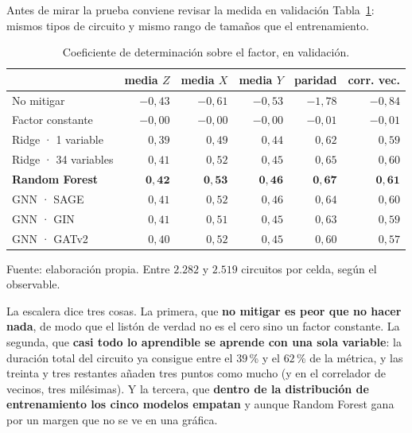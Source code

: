 Antes de mirar la prueba conviene revisar la medida en validación
Tabla~\ref{tab:escalera_val}: mismos tipos de circuito y mismo rango de tamaños que el entrenamiento.

\begin{table}[htbp]
    \centering
    \caption{Coeficiente de determinación sobre el factor, en validación.}
    \label{tab:escalera_val}
    {\footnotesize
    \begin{tabular}{@{}lrrrrr@{}}
        \toprule
        & \textbf{media $Z$} & \textbf{media $X$} & \textbf{media $Y$}
        & \textbf{paridad} & \textbf{corr. vec.} \\
        \midrule
        No mitigar            & $-0{,}43$ & $-0{,}61$ & $-0{,}53$ & $-1{,}78$ & $-0{,}84$ \\
        Factor constante      & $-0{,}00$ & $-0{,}00$ & $-0{,}00$ & $-0{,}01$ & $-0{,}01$ \\
        Ridge · 1 variable    & $0{,}39$ & $0{,}49$ & $0{,}44$ & $0{,}62$ & $0{,}59$ \\
        Ridge · 34 variables  & $0{,}41$ & $0{,}52$ & $0{,}45$ & $0{,}65$ & $0{,}60$ \\
        \textbf{Random Forest} & $\bm{0{,}42}$ & $\bm{0{,}53}$ & $\bm{0{,}46}$ & $\bm{0{,}67}$ & $\bm{0{,}61}$ \\
        GNN · SAGE            & $0{,}41$ & $0{,}52$ & $0{,}46$ & $0{,}64$ & $0{,}60$ \\
        GNN · GIN             & $0{,}41$ & $0{,}51$ & $0{,}45$ & $0{,}63$ & $0{,}59$ \\
        GNN · GATv2           & $0{,}40$ & $0{,}52$ & $0{,}45$ & $0{,}60$ & $0{,}57$ \\
        \bottomrule
    \end{tabular}}

    {\footnotesize Fuente: elaboración propia. Entre $2{.}282$ y $2{.}519$ circuitos por
    celda, según el observable.}
\end{table}

La escalera dice tres cosas. La primera, que \textbf{no mitigar es peor que
no hacer nada}, de modo que el listón de verdad no es el cero sino un factor constante. La segunda,
que \textbf{casi todo lo aprendible se aprende con una sola variable}: la duración total del
circuito ya consigue entre el $39$\,\% y el $62$\,\% de la métrica, y las treinta y tres
restantes añaden tres puntos como mucho (y en el correlador de vecinos, tres milésimas). Y la tercera, que \textbf{dentro de la distribución
de entrenamiento los cinco modelos empatan} y aunque Random Forest gana por un margen que no se ve en una gráfica.

